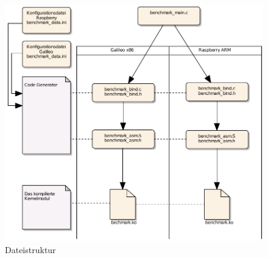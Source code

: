 \begin{figure}
\centering
\includegraphics[scale=0.7]{images/filestructure.pdf}
\caption{Dateistruktur}
\label{fig:filestructure}
\end{figure}


